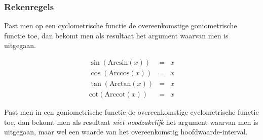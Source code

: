 \subsubsection{Rekenregels}

Past men op een cyclometrische functie de overeenkomstige goniometrische
functie toe, dan bekomt men als resultaat het argument waarvan men
is uitgegaan.

\begin{equation*}
\begin{array}{ccc}
\sin\left(\textrm{Arcsin}(x)\right) & = & x\\
\cos\left(\textrm{Arccos}(x)\right) & = & x\\
\tan\left(\textrm{Arctan}(x)\right) & = & x\\
\textrm{cot}\left(\textrm{Arccot}(x)\right) & = & x
\end{array}
\end{equation*}


Past men in een goniometrische functie de overeenkomstige
cyclometrische functie toe, dan bekomt men als resultaat \emph{niet
noodzakelijk} het argument waarvan men is uitgegaan, maar wel een
waarde van het overeenkomstig hoofdwaarde-interval.
